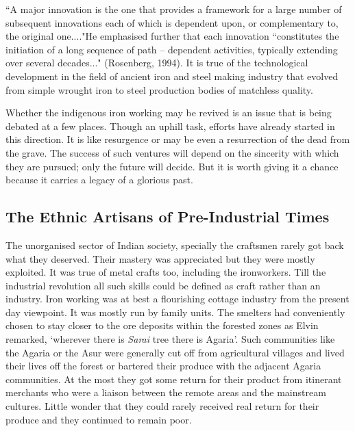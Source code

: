``A major innovation is the one that provides a framework for a large number of subsequent innovations each of which is dependent upon, or complementary to, the original one...."He emphasised further that each innovation ``constitutes the initiation of a long sequence of path – dependent activities, typically extending over several decades..." (Rosenberg, 1994). It is true of the technological development in the field of ancient iron and steel making industry that evolved from simple wrought iron to steel production bodies of matchless quality.

Whether the indigenous iron working may be revived is an issue that is being debated at a few places. Though an uphill task, efforts have already started in this direction. It is like resurgence or may be even a resurrection of the dead from the grave. The success of such ventures will depend on the sincerity with which they are pursued; only the future will decide. But it is worth giving it a chance because it carries a legacy of a glorious past.

\vspace{-.3cm}

\subsection*{The Ethnic Artisans of Pre-Industrial Times}\label{chapter8-subsection-7}

\vspace{-.2cm}

The unorganised sector of Indian society, specially the craftsmen rarely got back what they deserved. Their mastery was appreciated but they were mostly exploited. It was true of metal crafts too, including the ironworkers. Till the industrial revolution all such skills could be defined as craft rather than an industry. Iron working was at best a flourishing cottage industry from the present day viewpoint. It was mostly run by family units. The smelters had conveniently chosen to stay closer to the ore deposits within the forested zones as Elvin remarked, `wherever there is {\it Sarai} tree there is Agaria'. Such communities like the Agaria or the Asur were generally cut off from agricultural villages and lived their lives off the forest or bartered their produce with the adjacent Agaria communities. At the most they got some return for their product from itinerant merchants who were a liaison between the remote areas and the mainstream cultures. Little wonder that they could rarely received real return for their produce and they continued to remain poor. 

